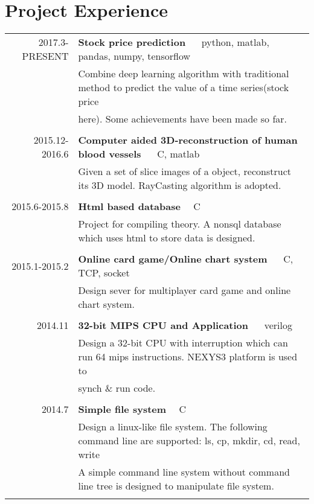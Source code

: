 \documentclass[10pt]{article} %
\begin{document}
{\begin{minipage}[t]{0.44\textwidth}
	
\end{minipage} %


\section{Project Experience} 

\begin{supertabular}{rl}
2017.3-PRESENT
& \textbf{Stock price prediction}   ~~ python, matlab, pandas, numpy, tensorflow\\
& Combine deep learning algorithm with traditional method to predict the value of a time series(stock price \\
& here). Some achievements have been made so far.\\
& \\

2015.12-2016.6
& \textbf{Computer aided 3D-reconstruction of human blood vessels} ~~ C, matlab\\
& Given a set of slice images of a object, reconstruct its 3D model. RayCasting algorithm is adopted.\\
& \\

2015.6-2015.8
& \textbf{Html based database} ~~C\\
& Project for compiling theory. A nonsql database which uses html to store data is designed. \\
& \\

2015.1-2015.2
& \textbf{Online card game/Online chart system} ~~ C, TCP, socket\\
& Design sever for multiplayer card game and online chart system. \\
& \\

2014.11
& \textbf{32-bit MIPS CPU and Application} ~~ verilog\\
& Design a 32-bit CPU with interruption which can run 64 mips instructions. NEXYS3 platform is used to \\
& synch \& run code. \\
& \\

2014.7
& \textbf{Simple file system} ~~C\\
& Design a linux-like file system. The following command line are supported: ls, cp, mkdir, cd, read, write \\
& A simple command line system without command line tree is designed to manipulate file system.\\
& \\





\end{supertabular}}
\end{document}
